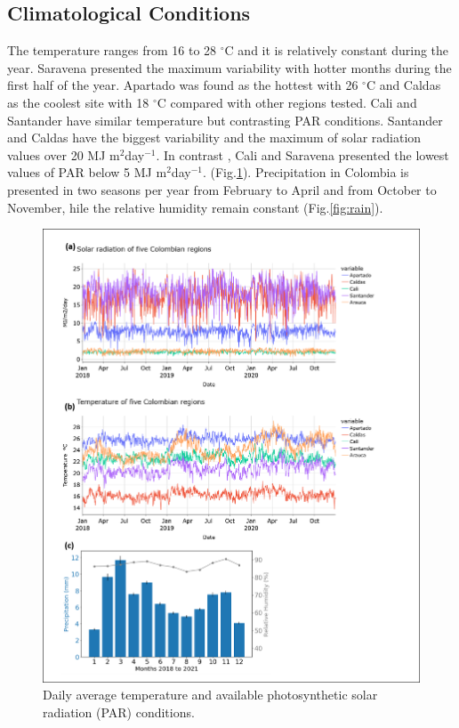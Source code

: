 \documentclass[gene,journal,article,submit,moreauthors,pdftex]{Definitions/mdpi}
\begin{document}
\subsection{Climatological Conditions}
The temperature ranges from 16 to 28 $^\circ$C and it is relatively constant during the year. Saravena presented the maximum variability with hotter months during the first half of the year.  Apartado was found as the hottest with 26 $^\circ$C and Caldas as the coolest site with 18 $^\circ$C compared with other regions tested. Cali and Santander have similar temperature but contrasting PAR conditions. Santander and Caldas have the biggest variability and the maximum of solar radiation values over 20 MJ m$^{2}$day$^{-1}$. In contrast , Cali and Saravena presented the lowest values of PAR below 5 MJ m$^{2}$day$^{-1}$. (Fig.\ref{fig:temp}). Precipitation in Colombia is presented in two seasons per year from February to April and from October to November, hile the relative humidity remain constant (Fig.\ref{fig:rain}).

\begin{figure}[h!]
	\centering
	\includegraphics[scale=0.5]{images/clima.png}
	\caption{\footnotesize {Daily average temperature and available photosynthetic solar radiation (PAR) conditions. \\}}	
	\label{fig:temp}
\end{figure}
\end{document}
